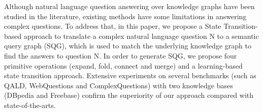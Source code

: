 Although natural language question answering over knowledge graphs have been studied in the literature, existing methods have some limitations in answering complex questions. To address that, in this paper, we propose a State Transition-based approach to translate a complex natural language question N to a semantic query graph (SQG), which is used to match the underlying knowledge graph to find the answers to question N. In order to generate SQG, we propose four primitive operations (expand, fold, connect and merge) and a learning-based state transition approach. Extensive experiments on several benchmarks (such as QALD, WebQuestions and ComplexQuestions) with two knowledge bases (DBpedia and Freebase) confirm the superiority of our approach compared with state-of-the-arts.
